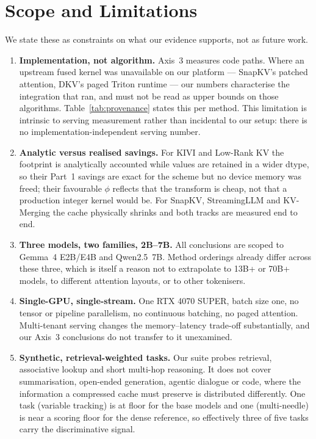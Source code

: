\documentclass{article}
\theoremstyle{definition}
\begin{document}
\section{Scope and Limitations}
\label{sec:limitations}

We state these as constraints on what our evidence supports, not as future work.

\begin{enumerate}[leftmargin=*,itemsep=2.5pt,topsep=3pt]
    \item \textbf{Implementation, not algorithm.} Axis~3 measures code paths. Where an upstream fused kernel was unavailable on our platform --- SnapKV's patched attention, DKV's paged Triton runtime --- our numbers characterise the integration that ran, and must not be read as upper bounds on those algorithms. Table~\ref{tab:provenance} states this per method. This limitation is intrinsic to serving measurement rather than incidental to our setup: there is no implementation-independent serving number.
    \item \textbf{Analytic versus realised savings.} For KIVI and Low-Rank KV the footprint is analytically accounted while values are retained in a wider dtype, so their Part~1 savings are exact for the scheme but no device memory was freed; their favourable $\phi$ reflects that the transform is cheap, not that a production integer kernel would be. For SnapKV, StreamingLLM and KV-Merging the cache physically shrinks and both tracks are measured end to end.
    \item \textbf{Three models, two families, 2B--7B.} All conclusions are scoped to Gemma~4 E2B/E4B and Qwen2.5~7B. Method orderings already differ across these three, which is itself a reason not to extrapolate to 13B+ or 70B+ models, to different attention layouts, or to other tokenisers.
    \item \textbf{Single-GPU, single-stream.} One RTX 4070 SUPER, batch size one, no tensor or pipeline parallelism, no continuous batching, no paged attention. Multi-tenant serving changes the memory--latency trade-off substantially, and our Axis~3 conclusions do not transfer to it unexamined.
    \item \textbf{Synthetic, retrieval-weighted tasks.} Our suite probes retrieval, associative lookup and short multi-hop reasoning. It does not cover summarisation, open-ended generation, agentic dialogue or code, where the information a compressed cache must preserve is distributed differently. One task (variable tracking) is at floor for the base models and one (multi-needle) is near a scoring floor for the dense reference, so effectively three of five tasks carry the discriminative signal.

\end{enumerate}
\end{document}
